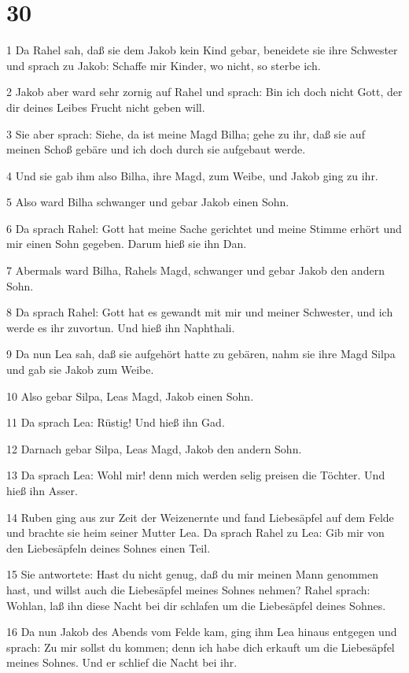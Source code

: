 \chapter{30}

\par 1 Da Rahel sah, daß sie dem Jakob kein Kind gebar, beneidete sie ihre Schwester und sprach zu Jakob: Schaffe mir Kinder, wo nicht, so sterbe ich.
\par 2 Jakob aber ward sehr zornig auf Rahel und sprach: Bin ich doch nicht Gott, der dir deines Leibes Frucht nicht geben will.
\par 3 Sie aber sprach: Siehe, da ist meine Magd Bilha; gehe zu ihr, daß sie auf meinen Schoß gebäre und ich doch durch sie aufgebaut werde.
\par 4 Und sie gab ihm also Bilha, ihre Magd, zum Weibe, und Jakob ging zu ihr.
\par 5 Also ward Bilha schwanger und gebar Jakob einen Sohn.
\par 6 Da sprach Rahel: Gott hat meine Sache gerichtet und meine Stimme erhört und mir einen Sohn gegeben. Darum hieß sie ihn Dan.
\par 7 Abermals ward Bilha, Rahels Magd, schwanger und gebar Jakob den andern Sohn.
\par 8 Da sprach Rahel: Gott hat es gewandt mit mir und meiner Schwester, und ich werde es ihr zuvortun. Und hieß ihn Naphthali.
\par 9 Da nun Lea sah, daß sie aufgehört hatte zu gebären, nahm sie ihre Magd Silpa und gab sie Jakob zum Weibe.
\par 10 Also gebar Silpa, Leas Magd, Jakob einen Sohn.
\par 11 Da sprach Lea: Rüstig! Und hieß ihn Gad.
\par 12 Darnach gebar Silpa, Leas Magd, Jakob den andern Sohn.
\par 13 Da sprach Lea: Wohl mir! denn mich werden selig preisen die Töchter. Und hieß ihn Asser.
\par 14 Ruben ging aus zur Zeit der Weizenernte und fand Liebesäpfel auf dem Felde und brachte sie heim seiner Mutter Lea. Da sprach Rahel zu Lea: Gib mir von den Liebesäpfeln deines Sohnes einen Teil.
\par 15 Sie antwortete: Hast du nicht genug, daß du mir meinen Mann genommen hast, und willst auch die Liebesäpfel meines Sohnes nehmen? Rahel sprach: Wohlan, laß ihn diese Nacht bei dir schlafen um die Liebesäpfel deines Sohnes.
\par 16 Da nun Jakob des Abends vom Felde kam, ging ihm Lea hinaus entgegen und sprach: Zu mir sollst du kommen; denn ich habe dich erkauft um die Liebesäpfel meines Sohnes. Und er schlief die Nacht bei ihr.
